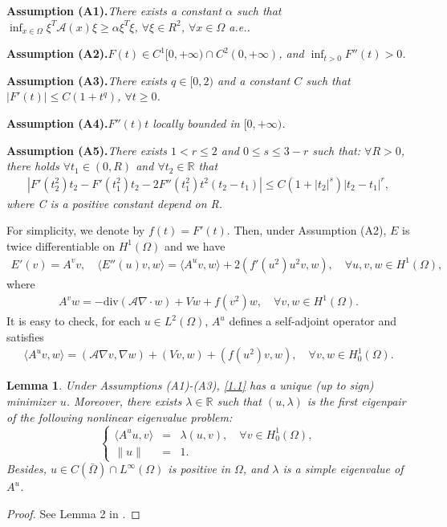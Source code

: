 \documentclass[10pt,a4paper]{amsart}
\numberwithin{equation}{section}
\newtheorem{lemma}{Lemma}[section]
\newcommand{\di}{\text{div}}
\newcommand{\A}{\mathcal{A}}
\newcommand{\Real}{\mathbb{R}}
\newcommand{\la}{\langle}
\newcommand{\ran}{\rangle}
\begin{document}
\textbf{Assumption (A1).}\emph{There exists a constant $\alpha$ such that $\displaystyle\inf_{x\in \Omega}\xi^T\A(x)\xi\ge\alpha\xi^T\xi$, $\forall \xi\in R^2$, $\forall x\in\Omega$ a.e..
}

\textbf{Assumption (A2).}\emph{$F(t)\in C^1[0,+\infty)\cap C^2(0,+\infty)$, and $\displaystyle\inf_{t>0}F''(t)>0$.
}

\textbf{Assumption (A3).}\emph{There exists $q\in [0,2)$ and a constant $C$ such that $|F'(t)|\le C(1+t^q)$, $\forall t\ge0$.
}

\textbf{Assumption (A4).}\emph{$F''(t)t$ locally bounded in $[0,+\infty)$.
}

\textbf{Assumption (A5).}\emph{There exists $1<r\le 2$ and $0\le s\le 3-r$ such that: $\forall R>0$, there holds $\forall t_1\in(0,R)$ and $\forall t_2\in\Real$ that
	\begin{eqnarray*}
		|F'(t_2^2)t_2-F'(t_1^2)t_2-2F''(t_1^2)t^2(t_2-t_1)|\le C(1+|t_2|^s)|t_2-t_1|^r,
	\end{eqnarray*}
	where C is a positive constant depend on R.
}


For simplicity, we denote by $f(t)=F'(t)$. Then, under Assumption (A2), $E$ is twice differentiable on $H^1(\Omega)$ and we have
\begin{eqnarray*}
	E'(v)=A^vv,\quad \la E''(u)v,w\ran=\la A^uv,w\ran+2(f'(u^2)u^2v,w),\quad\forall u,v,w\in H^1(\Omega),
\end{eqnarray*}
where
\begin{eqnarray*}
	A^vw=-\di(\A\nabla\cdot w)+Vw+f(v^2)w,\quad\forall v,w\in H^1(\Omega).
\end{eqnarray*}
It is easy to check, for each $u\in L^2(\Omega)$, $A^u$ defines a self-adjoint operator and satisfies
\begin{eqnarray*}
	\la A^uv,w\ran=(\A\nabla v,\nabla w)+(Vv,w)+(f(u^2)v,w),\quad\forall v,w\in H_0^1(\Omega).
\end{eqnarray*}

\begin{lemma}\label{lem1}
	Under Assumptions (A1)-(A3), \eqref{1.1} has a unique (up to sign) minimizer $u$. Moreover, there exists $\lambda\in\Real$ such that $(u,\lambda)$ is the first eigenpair of the following nonlinear eigenvalue problem:
	\begin{equation}\label{1.3}
		\left\{\begin{array}{rcl}
			\la A^uu,v\ran&=&\lambda (u,v),\quad\forall v\in H_0^1(\Omega),\\
			\|u\| &=&1.
		\end{array}\right.
	\end{equation}
	Besides, $u\in C(\bar{\Omega})\cap L^\infty(\Omega)$ is positive in $\Omega$, and $\lambda$ is a simple eigenvalue of $A^u$.
\end{lemma}
\begin{proof}
	See Lemma 2 in \cite{Eric2009}.
\end{proof}
\end{document}
